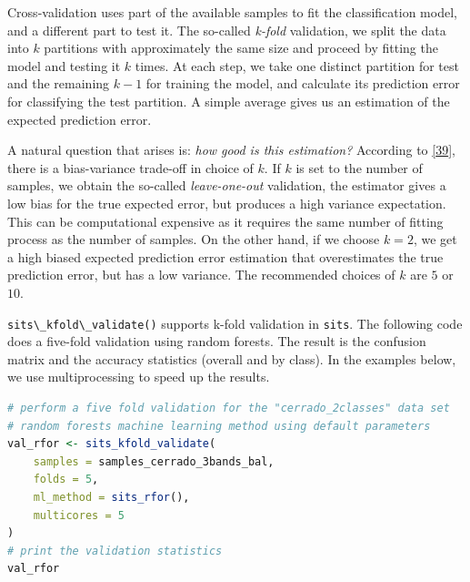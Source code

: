 \documentclass[
  11pt,
]{report}
\newcommand{\passthrough}[1]{#1}
\begin{document}
Cross-validation uses part of the available samples to fit the
classification model, and a different part to test it. The so-called
\emph{k-fold} validation, we split the data into \(k\) partitions with
approximately the same size and proceed by fitting the model and testing
it \(k\) times. At each step, we take one distinct partition for test
and the remaining \({k-1}\) for training the model, and calculate its
prediction error for classifying the test partition. A simple average
gives us an estimation of the expected prediction error.

A natural question that arises is: \emph{how good is this estimation?}
According to \protect\hyperlink{ref-Hastie2009}{{[}39{]}}, there is a
bias-variance trade-off in choice of \(k\). If \(k\) is set to the
number of samples, we obtain the so-called \emph{leave-one-out}
validation, the estimator gives a low bias for the true expected error,
but produces a high variance expectation. This can be computational
expensive as it requires the same number of fitting process as the
number of samples. On the other hand, if we choose \({k=2}\), we get a
high biased expected prediction error estimation that overestimates the
true prediction error, but has a low variance. The recommended choices
of \(k\) are \(5\) or \(10\).

\passthrough{\lstinline!sits\_kfold\_validate()!} supports k-fold
validation in \passthrough{\lstinline!sits!}. The following code does a
five-fold validation using random forests. The result is the confusion
matrix and the accuracy statistics (overall and by class). In the
examples below, we use multiprocessing to speed up the results.

\begin{lstlisting}[language=R]
# perform a five fold validation for the "cerrado_2classes" data set
# random forests machine learning method using default parameters
val_rfor <- sits_kfold_validate(
    samples = samples_cerrado_3bands_bal, 
    folds = 5, 
    ml_method = sits_rfor(),
    multicores = 5
)
# print the validation statistics
val_rfor
\end{lstlisting}
\end{document}

